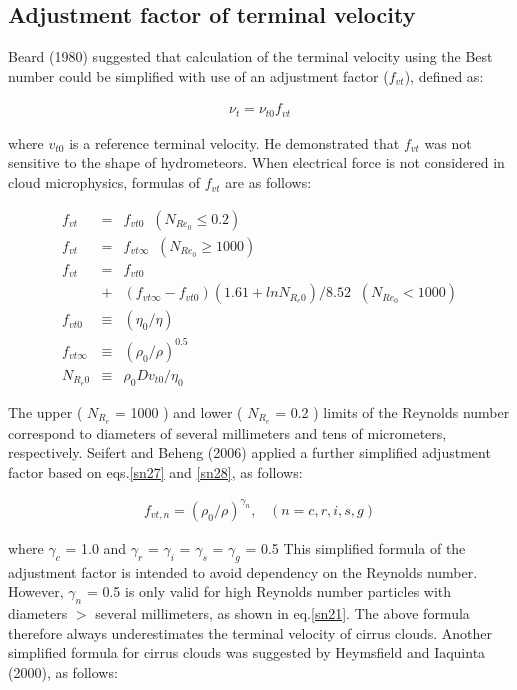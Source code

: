 \subsection{Adjustment factor of terminal velocity}
Beard (1980) suggested that calculation of the terminal velocity using the Best number could be simplified with use of an adjustment factor ($f_{vt}$), defined as:

\begin{eqnarray}
\nu_{t}=\nu_{t0}f_{vt}
\label{sn23}
\end{eqnarray}

where $v_{t0}$ is a reference terminal velocity. He demonstrated that $f_{vt}$ was not sensitive to the shape of hydrometeors. When electrical force is not considered in cloud microphysics, formulas of $f_{vt}$ are as follows:

\begin{eqnarray}
f_{vt}&=&f_{vt0}\;\;(N_{Re_{0}}\leq0.2)\label{sn24}\\
f_{vt}&=&f_{vt\infty}\;\;(N_{Re_{0}}\geq1000)\label{sn25}\\
f_{vt}&=&f_{vt0}\nonumber\\
&+&(f_{vt\infty}-f_{vt0})(1.61+lnN_{R_{e}0})/8.52\;\;(N_{Re_{0}}<1000)\label{sn26}\\
f_{vt0}&\equiv&(\eta_{0}/\eta)\label{sn27}\\
f_{vt\infty}&\equiv&(\rho_{0}/\rho)^{0.5}\label{sn28}\\
N_{R_{e}0}&\equiv&\rho_{0}Dv_{t0}/\eta_{0}\label{sn29}
\end{eqnarray}

The upper ( $N_{R_{e}}$ = 1000 ) and lower ( $N_{R_{e}}$ = 0.2 ) limits of the Reynolds number correspond to diameters of several millimeters and tens of micrometers, respectively. Seifert and Beheng (2006) applied a further simplified adjustment factor based on eqs.\ref{sn27} and \ref{sn28}, as follows:

\begin{eqnarray}
f_{vt,n}=(\rho_{0}/\rho)^{\gamma_{n}}, \;\;\;(n=c,r,i,s,g)
\label{sn30}
\end{eqnarray}

where $\gamma_{c}$ = 1.0 and $\gamma_{r}$ = $\gamma_{i}$ = $\gamma_{s}$ = $\gamma_{g}$ = 0.5 This simplified formula of the adjustment factor is intended to avoid dependency on the Reynolds number. However, $\gamma_{n}$ = 0.5 is only valid for high Reynolds number particles with diameters $>$ several millimeters, as shown in eq.\ref{sn21}. The above formula therefore always underestimates the terminal velocity of cirrus clouds. Another simplified formula for cirrus clouds was suggested by Heymsfield and Iaquinta (2000), as follows:

